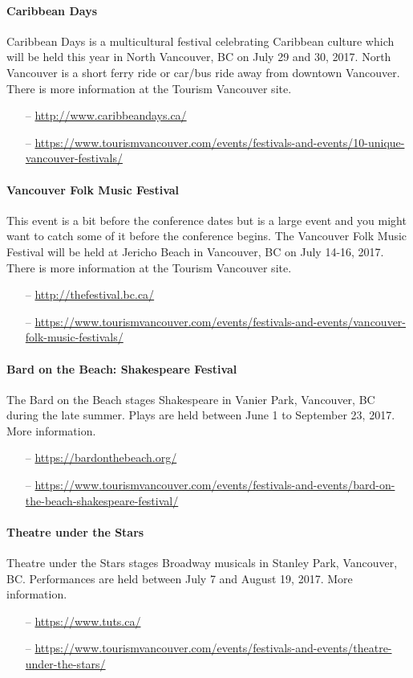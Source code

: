 \paragraph{Caribbean Days}
Caribbean Days is a multicultural festival celebrating Caribbean culture which will be held this year in North Vancouver, BC on July 29 and 30, 2017. North Vancouver is a short ferry ride or car/bus ride away from downtown Vancouver. There is more information at the Tourism Vancouver site.
%
\begin{itemize}
\item[--]\url{http://www.caribbeandays.ca/}
\item[--]\url{https://www.tourismvancouver.com/events/festivals-and-events/10-unique-vancouver-festivals/}
\end{itemize}

\paragraph{Vancouver Folk Music Festival}
This event is a bit before the conference dates but is a large event and you might want to catch some of it before the conference begins. The Vancouver Folk Music Festival will be held at Jericho Beach in Vancouver, BC on July 14-16, 2017. There is more information at the Tourism Vancouver site.
%
\begin{itemize}
\item[--]\url{http://thefestival.bc.ca/}
\item[--]\url{https://www.tourismvancouver.com/events/festivals-and-events/vancouver-folk-music-festivals/}
\end{itemize}

\paragraph{Bard on the Beach: Shakespeare Festival}
The Bard on the Beach stages Shakespeare in Vanier Park, Vancouver, BC during the late summer. Plays are held between June 1 to September 23, 2017. More information.
%
\begin{itemize}
\item[--]\url{https://bardonthebeach.org/}
\item[--]\url{https://www.tourismvancouver.com/events/festivals-and-events/bard-on-the-beach-shakespeare-festival/}
\end{itemize}

\paragraph{Theatre under the Stars}
Theatre under the Stars stages Broadway musicals in Stanley Park, Vancouver, BC. Performances are held between July 7 and August 19, 2017. More information.
%
\begin{itemize}
\item[--]\url{https://www.tuts.ca/}
\item[--]\url{https://www.tourismvancouver.com/events/festivals-and-events/theatre-under-the-stars/}
\end{itemize}

